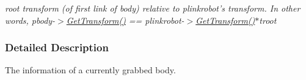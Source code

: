 \begin{DoxyCompactItemize}
\begin{DoxyCompactList}\small\item\em root transform (of first link of body) relative to plinkrobot's transform. In other words, pbody-\/$>$\hyperlink{classOpenRAVE_1_1KinBody_a2206c7317f62f083c3f57868ba82bfee}{GetTransform()} == plinkrobot-\/$>$\hyperlink{classOpenRAVE_1_1KinBody_a2206c7317f62f083c3f57868ba82bfee}{GetTransform()}$\ast$troot \item\end{DoxyCompactList}\end{DoxyCompactItemize}


\subsubsection{Detailed Description}
The information of a currently grabbed body. 